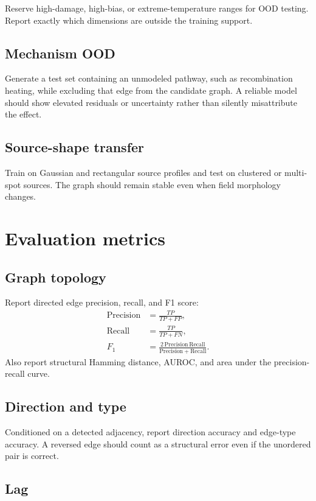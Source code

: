 \documentclass[11pt]{article}
\begin{document}
Reserve high-damage, high-bias, or extreme-temperature ranges for OOD testing. Report exactly which dimensions are outside the training support.

\subsection{Mechanism OOD}

Generate a test set containing an unmodeled pathway, such as recombination heating, while excluding that edge from the candidate graph. A reliable model should show elevated residuals or uncertainty rather than silently misattribute the effect.

\subsection{Source-shape transfer}

Train on Gaussian and rectangular source profiles and test on clustered or multi-spot sources. The graph should remain stable even when field morphology changes.

\section{Evaluation metrics}

\subsection{Graph topology}

Report directed edge precision, recall, and F1 score:
\begin{align}
\mathrm{Precision}&=\frac{TP}{TP+FP},\\
\mathrm{Recall}&=\frac{TP}{TP+FN},\\
F_1&=\frac{2\,\mathrm{Precision}\,\mathrm{Recall}}{\mathrm{Precision}+\mathrm{Recall}}.
\end{align}
Also report structural Hamming distance, AUROC, and area under the precision-recall curve.

\subsection{Direction and type}

Conditioned on a detected adjacency, report direction accuracy and edge-type accuracy. A reversed edge should count as a structural error even if the unordered pair is correct.

\subsection{Lag}
\end{document}
